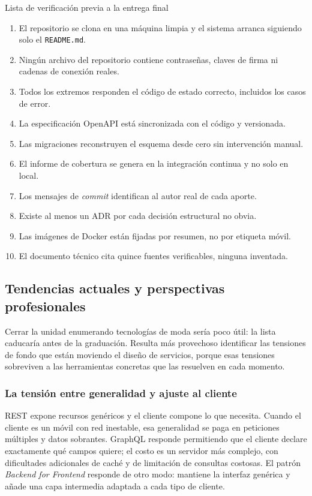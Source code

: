 \documentclass[11pt,a4paper,openany]{book}
\begin{document}
\begin{cajabuenas}{Lista de verificación previa a la entrega final}
	\begin{enumerate}
		\item El repositorio se clona en una máquina limpia y el sistema arranca siguiendo solo el \texttt{README.md}.
		\item Ningún archivo del repositorio contiene contraseñas, claves de firma ni cadenas de conexión reales.
		\item Todos los extremos responden el código de estado correcto, incluidos los casos de error.
		\item La especificación OpenAPI está sincronizada con el código y versionada.
		\item Las migraciones reconstruyen el esquema desde cero sin intervención manual.
		\item El informe de cobertura se genera en la integración continua y no solo en local.
		\item Los mensajes de \emph{commit} identifican al autor real de cada aporte.
		\item Existe al menos un ADR por cada decisión estructural no obvia.
		\item Las imágenes de Docker están fijadas por resumen, no por etiqueta móvil.
		\item El documento técnico cita quince fuentes verificables, ninguna inventada.
	\end{enumerate}
\end{cajabuenas}

\subsection{Tendencias actuales y perspectivas profesionales}
\label{sec:u4:tendencias}

Cerrar la unidad enumerando tecnologías de moda sería poco útil: la lista caducaría antes de la graduación. Resulta más provechoso identificar las tensiones de fondo que están moviendo el diseño de servicios, porque esas tensiones sobreviven a las herramientas concretas que las resuelven en cada momento.

\subsubsection{La tensión entre generalidad y ajuste al cliente}

REST expone recursos genéricos y el cliente compone lo que necesita. Cuando el cliente es un móvil con red inestable, esa generalidad se paga en peticiones múltiples y datos sobrantes. GraphQL responde permitiendo que el cliente declare exactamente qué campos quiere; el costo es un servidor más complejo, con dificultades adicionales de caché y de limitación de consultas costosas. El patrón \emph{Backend for Frontend} responde de otro modo: mantiene la interfaz genérica y añade una capa intermedia adaptada a cada tipo de cliente.
\end{document}
